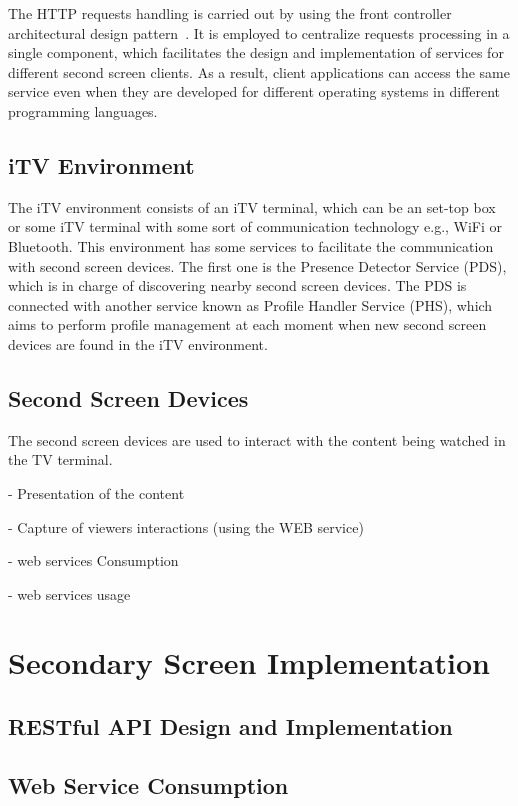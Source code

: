 \documentclass[journal]{IEEEtran}
\begin{document}
The HTTP requests handling is carried out by using the front controller architectural design pattern~\cite{Buschmann2007}. It is employed to centralize requests processing in a single component, which facilitates the design and implementation of services for different second screen clients. As a result, client applications can access the same service even when they are developed for different operating systems in different programming languages.

\subsection{iTV Environment}

The iTV environment consists of an iTV terminal, which can be an set-top box or some iTV terminal with some sort of communication technology e.g., WiFi or Bluetooth. This environment has some services to facilitate the communication with second screen devices. The first one is the Presence Detector Service (PDS), which is in charge of discovering nearby second screen devices. The PDS is connected with another service known as Profile Handler Service (PHS), which aims to perform profile management at each moment when new second screen devices are found in the iTV environment.

\subsection{Second Screen Devices}

The second screen devices are used to interact with the content being watched in the TV terminal.

- Presentation of the content

- Capture of viewers interactions (using the WEB service)

- web services Consumption

- web services usage

\section{Secondary Screen Implementation}

\subsection{RESTful API Design and Implementation}

\subsection{Web Service Consumption}
\end{document}
